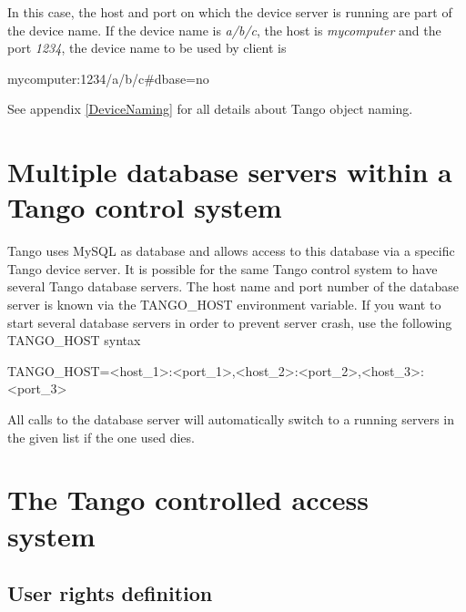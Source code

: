In this case, the host and port on which the device server is running
are part of the device name. If the device name is \emph{a/b/c}, the
host is \emph{mycomputer} and the port \emph{1234}, the device name
to be used by client is\begin{center}mycomputer:1234/a/b/c\#dbase=no\end{center}

See appendix \ref{DeviceNaming} for all details about Tango object
naming.


\section{Multiple database servers within a Tango control system}

Tango uses MySQL as database and allows access to this database via
a specific Tango device server. It is possible for the same Tango
control system to have several Tango database servers. The host name
and port number of the database server is known via the TANGO\_HOST
environment variable. If you want to start several database servers
in order to prevent server crash, use the following TANGO\_HOST syntax\begin{center}

TANGO\_HOST=<host\_1>:<port\_1>,<host\_2>:<port\_2>,<host\_3>:<port\_3>\end{center}

All calls to the database server will automatically switch to a running
servers in the given list if the one used dies.


\section{The Tango controlled access system}


\subsection{User rights definition}

